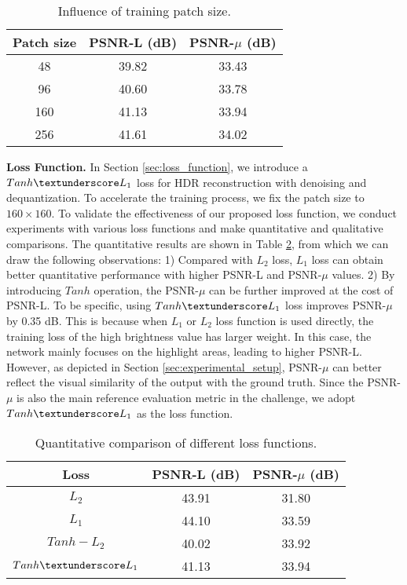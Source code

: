 \documentclass[final]{cvpr}
\begin{document}
\renewcommand\arraystretch{1.3}
\begin{table}[htbp]
	\begin{center}
		\begin{tabular}{ccc}
			\toprule
			Patch size & PSNR-L (dB) & PSNR-$\mu$ (dB) \\ \hline
			48 & 39.82 & 33.43 \\ 
			96 & 40.60 & 33.78 \\ 
			160 & 41.13 & 33.94 \\ 
			256 & 41.61 & 34.02 \\
			\bottomrule
		\end{tabular}
		
	\end{center}
\caption{Influence of training patch size.}
	\label{tab:patch_size}
	\vspace{-5pt}
\end{table}

\textbf{Loss Function.}
In Section \ref{sec:loss_function}, we introduce a $Tanh \textunderscore L_1$ loss for HDR reconstruction with denoising and dequantization. To accelerate the training process, we fix the patch size to $160 \times 160$. To validate the effectiveness of our proposed loss function, we conduct experiments with various loss functions and make quantitative and qualitative comparisons. The quantitative results are shown in Table \ref{tab:loss_function}, from which we can draw the following observations: 1) Compared with $L_2$ loss, $L_1$ loss can obtain better quantitative performance with higher PSNR-L and PSNR-$\mu$ values. 2) By introducing $Tanh$ operation, the PSNR-$\mu$ can be further improved at the cost of PSNR-L. To be specific, using $Tanh \textunderscore L_1$ loss improves PSNR-$\mu$ by 0.35 dB. This is because when $L_1$ or $L_2$ loss function is used directly, the training loss of the high brightness value has larger weight. In this case, the network mainly focuses on the highlight areas, leading to higher PSNR-L. However, as depicted in Section \ref{sec:experimental_setup}, PSNR-$\mu$ can better reflect the visual similarity of the output with the ground truth. Since the PSNR-$\mu$ is also the main reference evaluation metric in the challenge, we adopt $Tanh \textunderscore L_1$ as the loss function. 

\begin{table}[htbp]
	\begin{center}
		\begin{tabular}{ccc}
	    \toprule
			Loss & PSNR-L (dB) & PSNR-$\mu$ (dB) \\ \hline
			$L_2$ & 43.91 & 31.80 \\ $L_1$ & 44.10 & 33.59 \\ $Tanh{-}L_2$ & 40.02 & 33.92 \\ $Tanh \textunderscore L_1$ & 41.13 & 33.94 \\ 
		\bottomrule
		\end{tabular}
	\end{center}

	\caption{Quantitative comparison of different loss functions.}
	\label{tab:loss_function}
	\vspace{-7pt}
\end{table}
\end{document}
